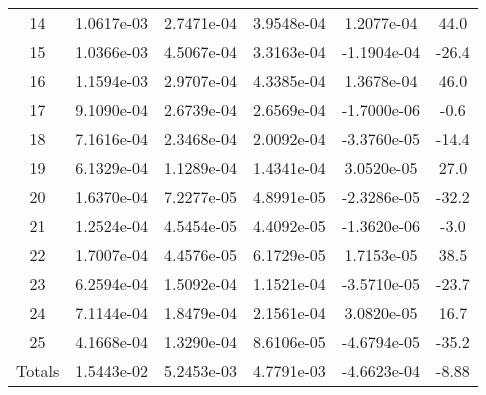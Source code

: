 \begin{table}[h]
\begin{center}
\begin{tabular}[h]{|c|c|c|c|c|c|}
14  &1.0617e-03 & 2.7471e-04 & 3.9548e-04 & 1.2077e-04 &  44.0 \\ 
15  &1.0366e-03 & 4.5067e-04 & 3.3163e-04 & -1.1904e-04 &  -26.4 \\
16  &1.1594e-03 & 2.9707e-04 & 4.3385e-04 & 1.3678e-04 &  46.0 \\ 
17  &9.1090e-04 & 2.6739e-04 & 2.6569e-04 & -1.7000e-06 &  -0.6 \\
18  &7.1616e-04 & 2.3468e-04 & 2.0092e-04 & -3.3760e-05 &  -14.4 \\
19  &6.1329e-04 & 1.1289e-04 & 1.4341e-04 & 3.0520e-05 &  27.0 \\ 
20  &1.6370e-04 & 7.2277e-05 & 4.8991e-05 & -2.3286e-05 &  -32.2 \\
21  &1.2524e-04 & 4.5454e-05 & 4.4092e-05 & -1.3620e-06 &  -3.0 \\
22  &1.7007e-04 & 4.4576e-05 & 6.1729e-05 & 1.7153e-05 &  38.5 \\ 
23  &6.2594e-04 & 1.5092e-04 & 1.1521e-04 & -3.5710e-05 &  -23.7 \\
24  &7.1144e-04 & 1.8479e-04 & 2.1561e-04 & 3.0820e-05 &  16.7 \\ 
25  &4.1668e-04 & 1.3290e-04 & 8.6106e-05 & -4.6794e-05 &  -35.2 \\
\hline \hline
Totals & 1.5443e-02 & 5.2453e-03 & 4.7791e-03 & -4.6623e-04   & -8.88 \\
\hline
\end{tabular}
\label{tab:loo_crud_bmass}
\end{center}
\end{table}


